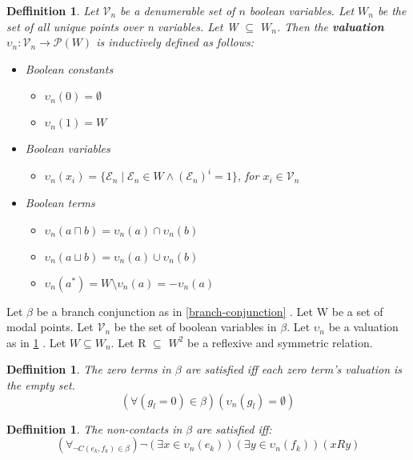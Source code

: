 \documentclass{article}
\newcommand\p{\mathcal{P}}
\newcommand\V{\mathcal{V}}
\newcommand\E{\mathcal{E}}
\newtheorem{defn}[theorem]{Deffinition}
\begin{document}
		\begin{defn}
			\label{valuation-modal-points}
			Let $\V_n$ be a denumerable set of $n$ boolean variables. Let $W_n$ be the set of all unique points over n variables. Let W $\subseteq$ $W_n$. Then the \textbf{valuation $\upsilon_n : \V_n \rightarrow \p(W)$} is inductively defined as follows:
			\begin{itemize}
				\item Boolean constants
					\begin{itemize}
						\item $\upsilon_n(0) = \emptyset$
						\item $\upsilon_n(1) = W$
					\end{itemize}
				\item Boolean variables
					\begin{itemize}
						\item $\upsilon_n(x_i) = \{ \E_n \mid \E_n \in W \land (\E_n)^i = 1 \}$, for $x_i \in \V_n$
					\end{itemize}
				\item Boolean terms
					\begin{itemize}
						\item $\upsilon_n(a \sqcap b) = \upsilon_n(a) \cap \upsilon_n(b)$
						\item $\upsilon_n(a \sqcup b) = \upsilon_n(a) \cup \upsilon_n(b)$
						\item $\upsilon_n(a^*) = W \setminus \upsilon_n(a) = -\upsilon_n(a)$
					\end{itemize}
			\end{itemize}
		\end{defn}

		Let $\beta$ be a branch conjunction as in \ref{branch-conjunction} . Let W be a set of modal points. Let $\V_n$ be the set of boolean variables in $\beta$. Let $\upsilon_n$ be a valuation as in \ref{valuation-modal-points} . Let $W \subseteq W_n$. Let R $\subseteq$ $W^2$ be a reflexive and symmetric relation.

		\begin{defn}
			The zero terms in $\beta$ are satisfied iff each zero term's valuation is the empty set.
			\begin{equation}
				(\forall (g_l = 0) \in \beta)(\upsilon_n(g_l) = \emptyset)
			\end{equation}
		\end{defn}

		\begin{defn}
			The non-contacts in $\beta$ are satisfied iff:
			\begin{equation}
				(\forall_{\neg C(e_k, f_k) \in \beta})\neg(\exists x \in \upsilon_n(e_k))(\exists y \in \upsilon_n(f_k))(xRy)
			\end{equation}
		\end{defn}
\end{document}
